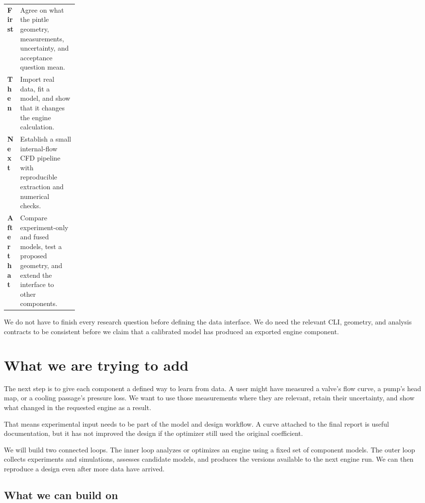 \setcounter{tocdepth}{1}
\tableofcontents
\vspace{0.2in}
\begin{tabularx}{\linewidth}{@{}P{0.17\linewidth}Y@{}}
\toprule
\textbf{First} & Agree on what the pintle geometry, measurements, uncertainty, and acceptance question mean.\\
\textbf{Then} & Import real data, fit a model, and show that it changes the engine calculation.\\
\textbf{Next} & Establish a small internal-flow CFD pipeline with reproducible extraction and numerical checks.\\
\textbf{After that} & Compare experiment-only and fused models, test a proposed geometry, and extend the interface to other components.\\
\bottomrule
\end{tabularx}

We do not have to finish every research question before defining the data interface. We do need the relevant CLI, geometry, and analysis contracts to be consistent before we claim that a calibrated model has produced an exported engine component.

\clearpage
\section{What we are trying to add}

The next step is to give each component a defined way to learn from data. A user might have measured a valve's flow curve, a pump's head map, or a cooling passage's pressure loss. We want to use those measurements where they are relevant, retain their uncertainty, and show what changed in the requested engine as a result.

That means experimental input needs to be part of the model and design workflow. A curve attached to the final report is useful documentation, but it has not improved the design if the optimizer still used the original coefficient.

We will build two connected loops. The inner loop analyzes or optimizes an engine using a fixed set of component models. The outer loop collects experiments and simulations, assesses candidate models, and produces the versions available to the next engine run. We can then reproduce a design even after more data have arrived.

\subsection{What we can build on}

